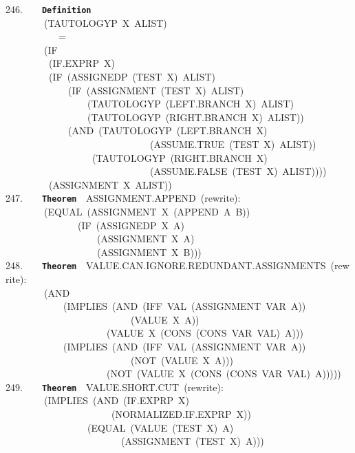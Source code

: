 \documentclass[11pt]{book}
\newenvironment{pubasis}{\begin{flushleft}\ttfamily\small}{\normalsize\rmfamily\end{flushleft}}
\newcommand{\axiomordefinition}[1]{\vspace{6pt}\texttt{\textbf{#1}}}
\begin{document}
\begin{pubasis}
246.~~~~\axiomordefinition{Definition}\\
~~~~~~~~(TAUTOLOGYP~X~ALIST)\\
~~~~~~~~~~~=\\
~~~~~~~~(IF\\
~~~~~~~~~(IF.EXPRP~X)\\
~~~~~~~~~(IF~(ASSIGNEDP~(TEST~X)~ALIST)\\
~~~~~~~~~~~~~(IF~(ASSIGNMENT~(TEST~X)~ALIST)\\
~~~~~~~~~~~~~~~~~(TAU\-TOL\-OGYP~(LEFT.BRANCH~X)~ALIST)\\
~~~~~~~~~~~~~~~~~(TAU\-TOL\-OGYP~(RIGHT.BRANCH~X)~ALIST))\\
~~~~~~~~~~~~~(AND~(TAU\-TOL\-OGYP~(LEFT.BRANCH~X)\\
~~~~~~~~~~~~~~~~~~~~~~~~~~~~~~(AS\-SUME.TRUE~(TEST~X)~ALIST))\\
~~~~~~~~~~~~~~~~~~(TAU\-TOL\-OGYP~(RIGHT.BRANCH~X)\\
~~~~~~~~~~~~~~~~~~~~~~~~~~~~~~(AS\-SUME.FALSE~(TEST~X)~ALIST))))\\
~~~~~~~~~(ASSIGNMENT~X~ALIST))\\

247.~~~~\axiomordefinition{Theorem}~~ASSIGN\-MENT.APPEND~(rewrite):\\
~~~~~~~~(EQUAL~(ASSIGNMENT~X~(APPEND~A~B))\\
~~~~~~~~~~~~~~~(IF~(ASSIGNEDP~X~A)\\
~~~~~~~~~~~~~~~~~~~(ASSIGNMENT~X~A)\\
~~~~~~~~~~~~~~~~~~~(ASSIGNMENT~X~B)))\\

248.~~~~\axiomordefinition{Theorem}~~VALUE.CAN.IG\-NORE.RE\-DUN\-DANT.ASSIGN\-MENTS~(rewrite):\\
~~~~~~~~(AND\\
~~~~~~~~~~~~(IMPLIES~(AND~(IFF~VAL~(ASSIGNMENT~VAR~A))\\
~~~~~~~~~~~~~~~~~~~~~~~~~~(VALUE~X~A))\\
~~~~~~~~~~~~~~~~~~~~~(VALUE~X~(CONS~(CONS~VAR~VAL)~A)))\\
~~~~~~~~~~~~(IMPLIES~(AND~(IFF~VAL~(ASSIGNMENT~VAR~A))\\
~~~~~~~~~~~~~~~~~~~~~~~~~~(NOT~(VALUE~X~A)))\\
~~~~~~~~~~~~~~~~~~~~~(NOT~(VALUE~X~(CONS~(CONS~VAR~VAL)~A)))))\\

249.~~~~\axiomordefinition{Theorem}~~VALUE.SHORT.CUT~(rewrite):\\
~~~~~~~~(IMPLIES~(AND~(IF.EXPRP~X)\\
~~~~~~~~~~~~~~~~~~~~~~(NOR\-MAL\-IZED.IF.EXPRP~X))\\
~~~~~~~~~~~~~~~~~(EQUAL~(VALUE~(TEST~X)~A)\\
~~~~~~~~~~~~~~~~~~~~~~~~(ASSIGNMENT~(TEST~X)~A)))\\


\end{pubasis}
\end{document}

